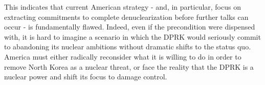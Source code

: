 \documentclass{article}
\begin{document}

This indicates that current American strategy - and, in particular, focus on extracting commitments to complete denuclearization before further talks can occur - is fundamentally flawed. Indeed, even if the precondition were dispensed with, it is hard to imagine a scenario in which the DPRK would seriously commit to abandoning its nuclear ambitions without dramatic shifts to the status quo. America must either radically reconsider what it is willing to do in order to remove North Korea as a nuclear threat, or face the reality that the DPRK is a nuclear power and shift its focus to damage control.






\todos
\end{document}
